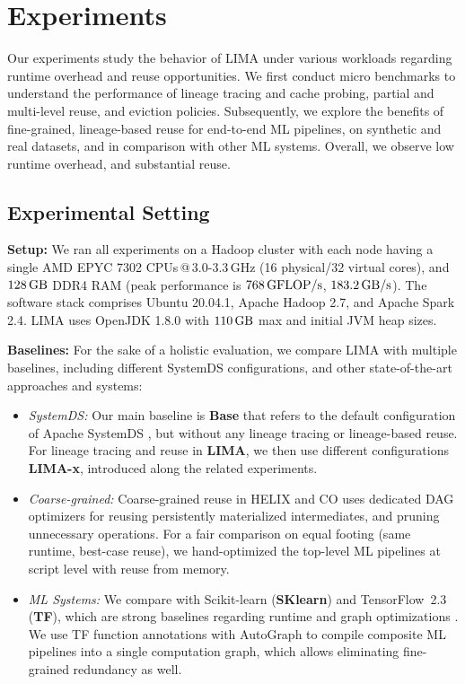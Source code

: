 \section{Experiments}
\label{sec:exp}

Our experiments study the behavior of LIMA under various workloads regarding runtime overhead and reuse opportunities. We first conduct micro benchmarks to understand the performance of lineage tracing and cache probing, partial and multi-level reuse, and eviction policies. Subsequently, we explore the benefits of fine-grained, lineage-based reuse for end-to-end ML pipelines, on synthetic and real datasets, and in comparison with other ML systems. Overall, we observe low runtime overhead, and substantial reuse.

\subsection{Experimental Setting}
\label{sec:expsetting}

\textbf{Setup:} We ran all experiments on a Hadoop cluster with each node having a single AMD EPYC 7302 CPUs\,@\,3.0-3.3\,GHz (16 physical/32 virtual cores), and $128\gb$ DDR4 RAM (peak performance is $768 \gflops$, $183.2 \gbs$). The software stack comprises Ubuntu 20.04.1, Apache Hadoop 2.7, and Apache Spark 2.4. LIMA uses OpenJDK 1.8.0 with $110\gb$ max and initial JVM heap sizes.

\textbf{Baselines:} For the sake of a holistic evaluation, we compare LIMA with multiple baselines, including different SystemDS configurations, and other state-of-the-art approaches and systems:  
\begin{itemize}
\item \emph{SystemDS:} Our main baseline is \textbf{Base} that refers to the default configuration of Apache SystemDS \cite{BoehmADGIKLPR20}, but without any lineage tracing or lineage-based reuse. For lineage tracing and reuse in \textbf{LIMA}, we then use different configurations \textbf{LIMA-x}, introduced along the related experiments. 
\item \emph{Coarse-grained:} Coarse-grained reuse in HELIX \cite{XinMMLSP18} and CO \cite{DerakhshanMARM20} uses dedicated DAG optimizers for reusing persistently materialized intermediates, and pruning unnecessary operations. For a fair comparison on equal footing (same runtime, best-case reuse), we hand-optimized the top-level ML pipelines at script level with reuse from memory.
\item \emph{ML Systems:} We compare with Scikit-learn \cite{PedregosaVGMTGBPWDVPCBPD11} (\textbf{SKlearn}) and TensorFlow~2.3~\cite{AbadiBCCDDDGIIK16} (\textbf{TF}), which are strong baselines regarding runtime and graph optimizations \cite{grappler}. We use TF function annotations with AutoGraph \cite{abs-1810-08061} to compile composite ML pipelines into a single computation graph, which allows eliminating fine-grained redundancy as well.
\end{itemize}

